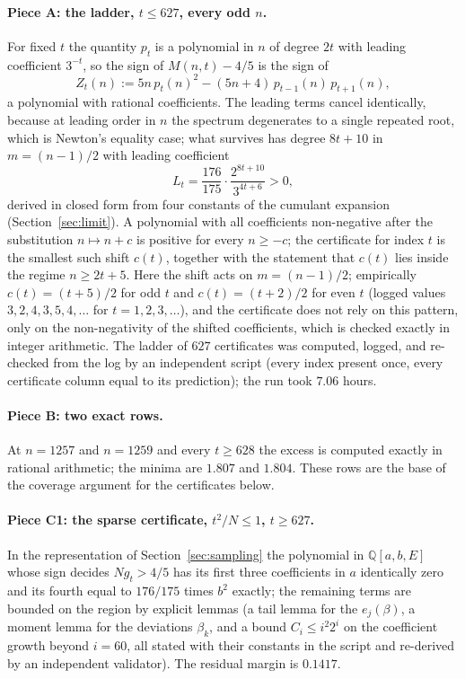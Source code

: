 \documentclass[12pt]{article}
\newcommand{\Qq}{\mathbb{Q}}
\begin{document}
\paragraph{Piece A: the ladder, $t\le 627$, every odd $n$.}
For fixed $t$ the quantity $p_t$ is a polynomial in $n$ of degree $2t$ with leading coefficient $3^{-t}$, so the sign of $M(n,t) - 4/5$ is the sign of
\[
Z_t(n) := 5n\,p_t(n)^2 - (5n+4)\,p_{t-1}(n)\,p_{t+1}(n),
\]
a polynomial with rational coefficients. The leading terms cancel identically, because at leading order in $n$ the spectrum degenerates to a single repeated root, which is Newton's equality case; what survives has degree $8t+10$ in $m = (n-1)/2$ with leading coefficient
\begin{equation}\label{eq:lead}
L_t = \frac{176}{175}\cdot\frac{2^{8t+10}}{3^{4t+6}} > 0 ,
\end{equation}
derived in closed form from four constants of the cumulant expansion (Section~\ref{sec:limit}). A polynomial with all coefficients non-negative after the substitution $n \mapsto n + c$ is positive for every $n \ge -c$; the certificate for index $t$ is the smallest such shift $c(t)$, together with the statement that $c(t)$ lies inside the regime $n \ge 2t+5$. Here the shift acts on $m = (n-1)/2$; empirically $c(t) = (t+5)/2$ for odd $t$ and $c(t) = (t+2)/2$ for even $t$ (logged values $3,2,4,3,5,4,\dots$ for $t = 1,2,3,\dots$), and the certificate does not rely on this pattern, only on the non-negativity of the shifted coefficients, which is checked exactly in integer arithmetic. The ladder of $627$ certificates was computed, logged, and re-checked from the log by an independent script (every index present once, every certificate column equal to its prediction); the run took $7.06$ hours.

\paragraph{Piece B: two exact rows.}
At $n = 1257$ and $n = 1259$ and every $t\ge 628$ the excess is computed exactly in rational arithmetic; the minima are $1.807$ and $1.804$. These rows are the base of the coverage argument for the certificates below.

\paragraph{Piece C1: the sparse certificate, $t^2/N\le 1$, $t\ge 627$.}
In the representation of Section~\ref{sec:sampling} the polynomial in $\Qq[a,b,E]$ whose sign decides $N g_t > 4/5$ has its first three coefficients in $a$ identically zero and its fourth equal to $176/175$ times $b^2$ exactly; the remaining terms are bounded on the region by explicit lemmas (a tail lemma for the $e_j(\beta)$, a moment lemma for the deviations $\beta_k$, and a bound $C_i \le i^2 2^i$ on the coefficient growth beyond $i=60$, all stated with their constants in the script and re-derived by an independent validator). The residual margin is $0.1417$.
\end{document}
